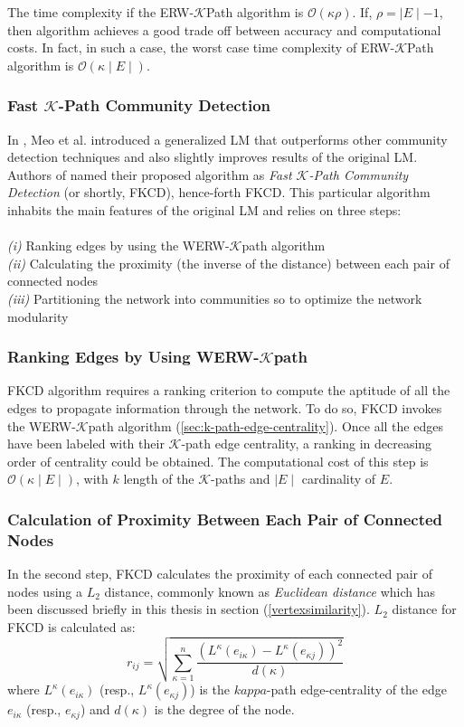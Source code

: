 The time complexity if the ERW-$\mathcal{K}$Path algorithm is $\mathcal{O}(\kappa \rho)$. If, $\rho = \mid E \mid - 1$, then algorithm achieves a good trade off between accuracy and computational costs. In fact, in such a case, the worst case time complexity of ERW-$\mathcal{K}$Path algorithm is $\mathcal{O}(\kappa \mid E \mid)$.

\subsubsection*{Fast $\mathcal{K}$-Path Community Detection}
In \cite{ref-28}, Meo et al. introduced a generalized LM \cite{ref-27} that outperforms other community detection techniques and also slightly improves results of the original LM. Authors of \cite{ref-28} named their proposed algorithm as \textit{Fast $\mathcal{K}$-Path Community Detection} (or shortly, FKCD), hence-forth FKCD. This particular algorithm inhabits the main features of the original LM and relies on three steps:\\\\
\textit{(i)} Ranking edges by using the WERW-$\mathcal{K}$path algorithm\\
\textit{(ii)} Calculating the proximity (the inverse of the distance) between each pair of connected nodes\\
\textit{(iii)} Partitioning the network into communities so to optimize the network modularity \cite{ref-1}

\subsubsection*{Ranking Edges by Using WERW-$\mathcal{K}$path}
FKCD algorithm requires a ranking criterion to compute the aptitude of all the edges to propagate information through the network. To do so, FKCD invokes the WERW-$\mathcal{K}$path algorithm (\ref{sec:k-path-edge-centrality}). Once all the edges have been labeled with their $\mathcal{K}$-path edge centrality, a ranking in decreasing order of centrality could be obtained. The computational cost of this step is $\mathcal{O} (\kappa \mid E \mid)$, with $k$ length of the $\mathcal{K}$-paths and $\mid E \mid$ cardinality of $E$.

\subsubsection*{Calculation of Proximity Between Each Pair of Connected Nodes}
In the second step, FKCD calculates the proximity of each connected pair of nodes using a $L_2$ distance, commonly known as \textit{Euclidean distance} which has been discussed briefly in this thesis in section (\ref{vertexsimilarity}). $L_2$ distance for FKCD is calculated as:
\begin{equation}\label{eq:node-proximity}
r_{ij} = \sqrt{\sum_{\kappa = 1}^{n} \dfrac{(L^\kappa (e_{i \kappa}) - L^\kappa (e_{\kappa j}))^2}{d(\kappa)}}
\end{equation}
where $L^\kappa(e_{i \kappa})$ (resp., $L^\kappa(e_{\kappa j})$) is the $kappa$-path edge-centrality of the edge $e_{i \kappa}$ (resp., $e_{\kappa j}$) and $d(\kappa)$ is the degree of the node.

